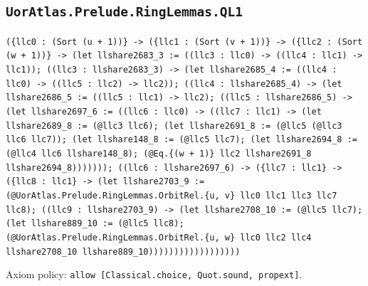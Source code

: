 \documentclass[11pt]{article}
\begin{document}
\subsection*{\texttt{UorAtlas.Prelude.RingLemmas.QL1}}
\noindent\texttt{(\{llc0 : (Sort (u + 1))\} -> (\{llc1 : (Sort (v + 1))\} -> (\{llc2 : (Sort (w + 1))\} -> (let llshare2683\_3 := ((llc3 : llc0) -> ((llc4 : llc1) -> llc1)); ((llc3 : llshare2683\_3) -> (let llshare2685\_4 := ((llc4 : llc0) -> ((llc5 : llc2) -> llc2)); ((llc4 : llshare2685\_4) -> (let llshare2686\_5 := ((llc5 : llc1) -> llc2); ((llc5 : llshare2686\_5) -> (let llshare2697\_6 := ((llc6 : llc0) -> ((llc7 : llc1) -> (let llshare2689\_8 := (@llc3 llc6); (let llshare2691\_8 := (@llc5 (@llc3 llc6 llc7)); (let llshare148\_8 := (@llc5 llc7); (let llshare2694\_8 := (@llc4 llc6 llshare148\_8); (@Eq.\{(w + 1)\} llc2 llshare2691\_8 llshare2694\_8))))))); ((llc6 : llshare2697\_6) -> (\{llc7 : llc1\} -> (\{llc8 : llc1\} -> (let llshare2703\_9 := (@UorAtlas.Prelude.RingLemmas.OrbitRel.\{u, v\} llc0 llc1 llc3 llc7 llc8); ((llc9 : llshare2703\_9) -> (let llshare2708\_10 := (@llc5 llc7); (let llshare889\_10 := (@llc5 llc8); (@UorAtlas.Prelude.RingLemmas.OrbitRel.\{u, w\} llc0 llc2 llc4 llshare2708\_10 llshare889\_10))))))))))))))))))}\par
\noindent Axiom policy: \texttt{allow [Classical.choice, Quot.sound, propext]}.\par
\end{document}
